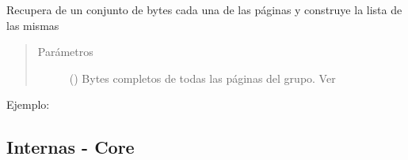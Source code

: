 \documentclass[a4paper,12pt,spanish]{sphinxmanual}
\begin{document}
\begin{fulllineitems}
\begin{fulllineitems}
\begin{description}
\end{description}

\end{fulllineitems}


\begin{fulllineitems}
\label{\detokenize{openerm.PageContainer:openerm.PageContainer.PageContainer.load}}
Recupera de un conjunto de bytes cada una de las páginas y construye la lista de las mismas
\begin{quote}\begin{description}
\item[{Parámetros}] \leavevmode
{} () \textendash{} Bytes completos de todas las páginas del grupo. Ver {\hyperref[\detokenize{openerm.PageContainer:openerm.PageContainer.PageContainer.dump}]{}}

\end{description}\end{quote}

Ejemplo:

\begin{sphinxVerbatim}[commandchars=\\\{\}]
   
  
   
\end{sphinxVerbatim}

\end{fulllineitems}


\end{fulllineitems}



\subsection{Internas - Core}
\label{\detokenize{openerm:internas-core}}\label{\detokenize{openerm.Block:block}}\label{\detokenize{openerm.Block:module-openerm.Block}}\label{\detokenize{openerm.Block:block}}
\end{document}
